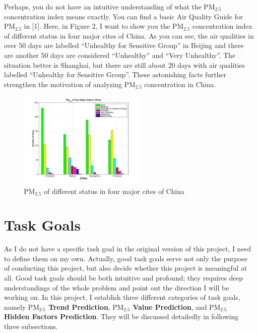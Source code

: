 \documentclass[letterpaper]{article}
\begin{document}
Perhaps, you do not have an intuitive understanding of what the $\text{PM}_{2.5}$ concentration index means exactly. You can find a basic Air Quality Guide for $\text{PM}_{2.5}$ in [1]. Here, in Figure 2, I want to show you the $\text{PM}_{2.5}$ concentration index of different status in four major cites of China. As you can see, the air qualities in over 50 days are labelled ``Unhealthy for Sensitive Group'' in Beijing and there are another 50 days are considered ``Unhealthy'' and ``Very Unhealthy''. The situation better is Shanghai, but there are still about 20 days with air qualities labelled ``Unhealthy for Sensitive Group''. These astonishing facts further strengthen the motivation of analyzing $\text{PM}_{2.5}$ concentration in China.

\begin{figure}[htbp]
	\centerline{\includegraphics[width=0.55\textwidth]{PM25_days.pdf}}
	\caption{$\text{PM}_{2.5}$ of different status in four major cites of China}\label{fig:digit}
\end{figure}

\section{Task Goals}
As I do not have a specific task goal in the original version of this project, I need to define them on my own. Actually, good task goals serve not only the purpose of conducting this project, but also decide whether this project is meaningful at all. Good task goals should be both intuitive and profound; they requires deep understandings of the whole problem and point out the direction I will be working on. In this project, I establish three different categories of task goals, namely \textbf{$\text{PM}_{2.5}$ Trend Prediction}, \textbf{$\text{PM}_{2.5}$ Value Prediction}, and \textbf{$\text{PM}_{2.5}$ Hidden Factors Prediction}. They will be discussed detailedly in following three subsections.
\end{document}
